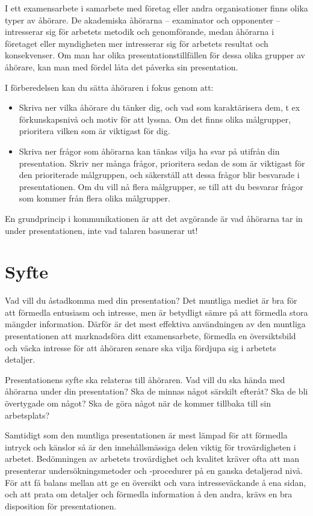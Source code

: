 I ett examensarbete i samarbete med företag eller andra organisationer
finns olika typer av åhörare. De akademiska åhörarna -- examinator och
opponenter -- intresserar sig för arbetets metodik och genomförande,
medan åhörarna i företaget eller myndigheten mer intresserar sig för
arbetets resultat och konsekvenser. Om man har olika
presentationstillfällen för dessa olika grupper av åhörare, kan man med
fördel låta det påverka sin presentation.

I förberedelsen kan du sätta åhöraren i fokus genom att:

\begin{itemize}
\item
  Skriva ner vilka åhörare du tänker dig, och vad som karaktärisera dem,
  t ex förkunskapsnivå och motiv för att lyssna. Om det finns olika
  målgrupper, prioritera vilken som är viktigast för dig.
\item
  Skriva ner frågor som åhörarna kan tänkas vilja ha svar på utifrån din
  presentation. Skriv ner många frågor, prioritera sedan de som är
  viktigast för den prioriterade målgruppen, och säkerställ att dessa
  frågor blir besvarade i presentationen. Om du vill nå flera
  målgrupper, se till att du besvarar frågor som kommer från flera olika
  målgrupper.
\end{itemize}

En grundprincip i kommunikationen är att det avgörande är vad åhörarna
tar in under presentationen, inte vad talaren basunerar ut!

\section{Syfte}\label{syfte}

Vad vill du åstadkomma med din presentation? Det muntliga mediet är bra
för att förmedla entusiasm och intresse, men är betydligt sämre på att
förmedla stora mängder information. Därför är det mest effektiva
användningen av den muntliga presentationen att marknadsföra ditt
examensarbete, förmedla en översiktsbild och väcka intresse för att
åhöraren senare ska vilja fördjupa sig i arbetets detaljer.

Presentationens syfte ska relateras till åhöraren. Vad vill du ska hända
med åhörarna under din presentation? Ska de minnas något särskilt
efteråt? Ska de bli övertygade om något? Ska de göra något när de kommer
tillbaka till sin arbetsplats?

Samtidigt som den muntliga presentationen är mest lämpad för att
förmedla intryck och känslor så är den innehållsmässiga delen viktig för
trovärdigheten i arbetet. Bedömningen av arbetets trovärdighet och
kvalitet kräver ofta att man presenterar undersökningsmetoder och
-procedurer på en ganska detaljerad nivå. För att få balans mellan att
ge en översikt och vara intresseväckande å ena sidan, och att prata om
detaljer och förmedla information å den andra, krävs en bra disposition
för presentationen.

